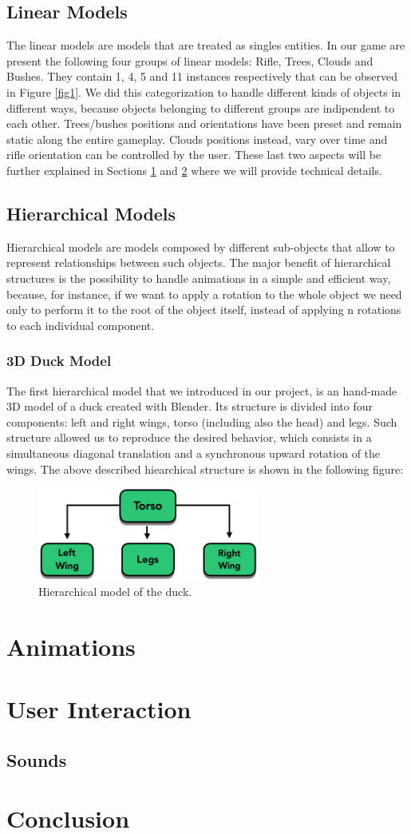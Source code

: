 \documentclass[12pt,a4paper]{article}
\begin{document}
\subsection{Linear Models} \label{linear}
The linear models are models that are treated as singles entities. In our game are present the following four groups of linear models: Rifle, Trees, Clouds and Bushes. They contain 1, 4, 5 and 11 instances respectively that can be observed in Figure \ref{fig1}. We did this categorization to handle different kinds of objects in different ways, because objects belonging to different groups are indipendent to each other. Trees/bushes positions and orientations have been preset and remain static along the entire gameplay. Clouds positions instead, vary over time and rifle orientation can be controlled by the user. These last two aspects will be further explained in Sections \ref{anim} and \ref{user} where we will provide technical details.
\subsection{Hierarchical Models}
Hierarchical models are models composed by different sub-objects that allow to represent relationships between such objects. The major benefit of hierarchical structures is the possibility to handle animations in a simple and efficient way, because, for instance, if we want to apply a rotation to the whole object we need only to perform it to the root of the object itself, instead of applying n rotations to each individual component.
\subsubsection{3D Duck Model}
The first hierarchical model that we introduced in our project, is an hand-made 3D model of a duck created with Blender. Its structure is divided into four components: left and right wings, torso (including also the head) and legs. Such structure allowed us to reproduce the desired behavior, which consists in a simultaneous diagonal translation and a synchronous upward rotation of the wings. The above described hiearchical structure is shown in the following figure:
\begin{figure}[hbt!]
	\centering
	\includegraphics[width=0.65\textwidth]{hier_duck}
	\caption{Hierarchical model of the duck.}
	\label{fig2}
\end{figure}

\section{Animations}\label{anim}
\section{User Interaction} \label{user}
\subsection{Sounds}
\section{Conclusion}
\end{document}
